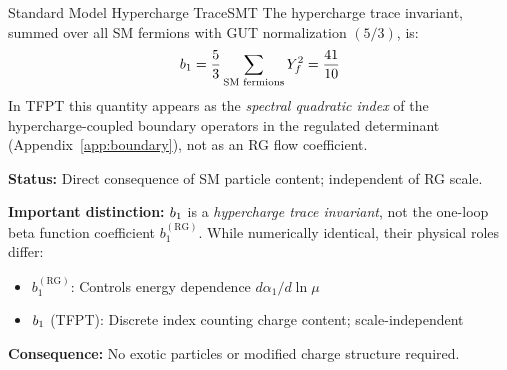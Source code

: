 \begin{axiom}{Standard Model Hypercharge Trace}{SMT}
The hypercharge trace invariant, summed over all SM fermions with GUT normalization 
$(5/3)$, is:
\begin{equation}
    b_1 = \frac{5}{3} \sum_{\text{SM fermions}} Y_f^2 = \frac{41}{10}
\end{equation}
In TFPT this quantity appears as the \emph{spectral quadratic index} of the
hypercharge-coupled boundary operators in the regulated determinant
(Appendix~\ref{app:boundary}), not as an RG flow coefficient.

\tcblower
\textbf{Status:} Direct consequence of SM particle content; independent of RG scale.

\textbf{Important distinction:} $b_1$ is a \emph{hypercharge trace invariant}, 
not the one-loop beta function coefficient $b_1^{(\text{RG})}$. While numerically 
identical, their physical roles differ:
\begin{itemize}[leftmargin=1.5em, topsep=2pt, itemsep=1pt]
    \item $b_1^{(\text{RG})}$: Controls energy dependence $d\alpha_1/d\ln\mu$
    \item $b_1$ (TFPT): Discrete index counting charge content; scale-independent
\end{itemize}

\textbf{Consequence:} No exotic particles or modified charge structure required.
\end{axiom}

